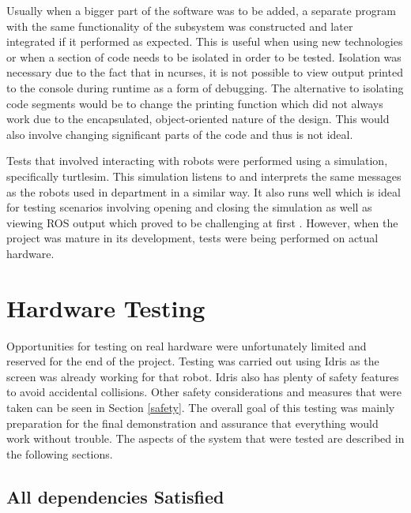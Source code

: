 Usually when a bigger part of the software was to be added, a separate program with the same functionality of the subsystem was constructed and later integrated if it performed as expected. This is useful when using new technologies or when a section of code needs to be isolated in order to be tested. Isolation was necessary due to the fact that in ncurses, it is not possible to view output printed to the console during runtime as a form of debugging. The alternative to isolating code segments would be to change the printing function which did not always work due to the encapsulated, object-oriented nature of the design. This would also involve changing significant parts of the code and thus is not ideal.

Tests that involved interacting with robots were performed using a simulation, specifically {\selectfont turtlesim}\cite{turtlesim}. This simulation listens to and interprets the same messages as the robots used in department in a similar way. It also runs well which is ideal for testing scenarios involving opening and closing the simulation as well as viewing {\selectfont ROS} output which proved to be challenging at first . However, when the project was mature in its development, tests were being performed on actual hardware.


\section{Hardware Testing}

Opportunities for testing on real hardware were unfortunately limited and reserved for the end of the project. Testing was carried out using Idris as the screen was already working for that robot. Idris also has plenty of safety features to avoid accidental collisions. Other safety considerations and measures that were taken can be seen in Section \ref{safety}. The overall goal of this testing was mainly preparation for the final demonstration and assurance that everything would work without trouble. The aspects of the system that were tested are described in the following sections.

\subsection{All dependencies Satisfied}

